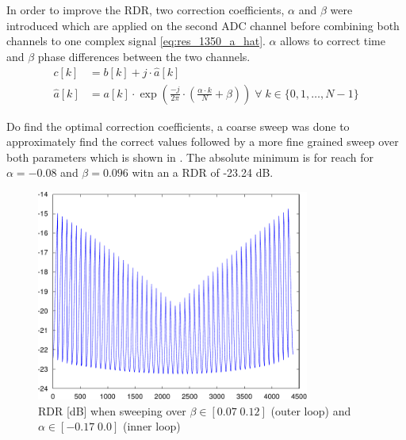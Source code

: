 In order to improve the \gls{RDR}, two correction coefficients, $\alpha$ and
$\beta$ were introduced which are applied on the second \gls{ADC} channel
before combining both channels to one complex signal \eqref{eq:res_1350_a_hat}.
$\alpha$ allows to correct time and $\beta$ phase differences between
the two  channels. \\

\begin{align}
  c[k] &= b[k] + j \cdot \hat a[k] \\
  \hat a[k] &= a[k]  \cdot \exp\left(
  \frac{-j}{2 \pi} \cdot \left(\frac{\alpha \cdot k}{N} + \beta\right)
  \right) \;\forall\; k \in \{0, 1, \dots,  N-1\}
  \label{eq:res_1350_a_hat}
\end{align}

Do find the optimal correction coefficients, a coarse sweep was done to approximately
find the correct values followed by a more fine grained sweep over both parameters
which is shown in .
The absolute minimum is for reach for $\alpha = -0.08$ and $\beta = 0.096$ witn an
a \gls{RDR} of -23.24 dB. \\

\begin{figure}[p]
  \centering
  \includegraphics[width=0.8\textwidth]{figures/matlab/res_1350_ab_sweep}
  \caption{\gls{RDR} [dB] when sweeping over $\beta \in [0.07 \; 0.12]$
    (outer loop) and $\alpha \in [-0.17 \; 0.0]$ (inner loop)}
  \label{fig:res_1800_ab_sweep}
\end{figure}

